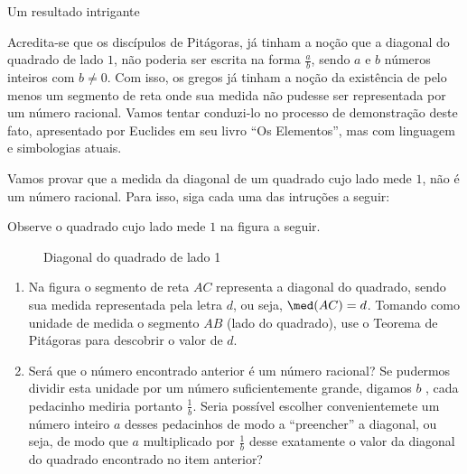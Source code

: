 \begin{task}{Um resultado intrigante}
\label{sub-ativ-irracional}


Acredita-se que os discípulos de Pitágoras, já tinham a noção que a diagonal do quadrado de lado $1$, não poderia ser escrita na forma $\frac{a}{b}$, sendo $a$ e $b$ números inteiros com $b \neq 0$. Com isso, os gregos já tinham a noção da existência de pelo menos um segmento de reta onde sua medida não pudesse ser representada por um número racional. Vamos tentar conduzi-lo no processo de demonstração deste fato, apresentado por Euclides em seu livro  “Os Elementos”, mas com linguagem e simbologias atuais.

Vamos provar que a medida da diagonal de um quadrado cujo lado mede $1$, não é um número racional. Para isso, siga cada uma das intruções a seguir:

Observe o quadrado cujo lado mede $1$ na figura a seguir.

\begin{figure}[H]
\centering

\caption{Diagonal do quadrado de lado 1}
\label{\detokenize{NO103-5:id8}}\label{\detokenize{NO103-5:id18}}
\end{figure}

\begin{enumerate}
\item {} 
Na figura o segmento de reta $AC$ representa a diagonal do quadrado, sendo sua medida representada pela letra $d$, ou seja, $\med(AC)=d$. Tomando como unidade de medida o segmento $AB$ (lado do quadrado), use o Teorema de Pitágoras para descobrir o valor de $d$.

\item {} 
Será que o número encontrado anterior é um número racional? Se pudermos dividir esta unidade por um número suficientemente grande, digamos $b$ , cada pedacinho mediria portanto $\displaystyle\frac{1}{b}$. Seria possível escolher convenientemete um número inteiro $a$ desses pedacinhos de modo a “preencher” a diagonal, ou seja, de modo que $a$ multiplicado por $\frac{1}{b}$ desse exatamente o valor da diagonal do quadrado encontrado no item anterior?


\end{enumerate}
\end{task}
